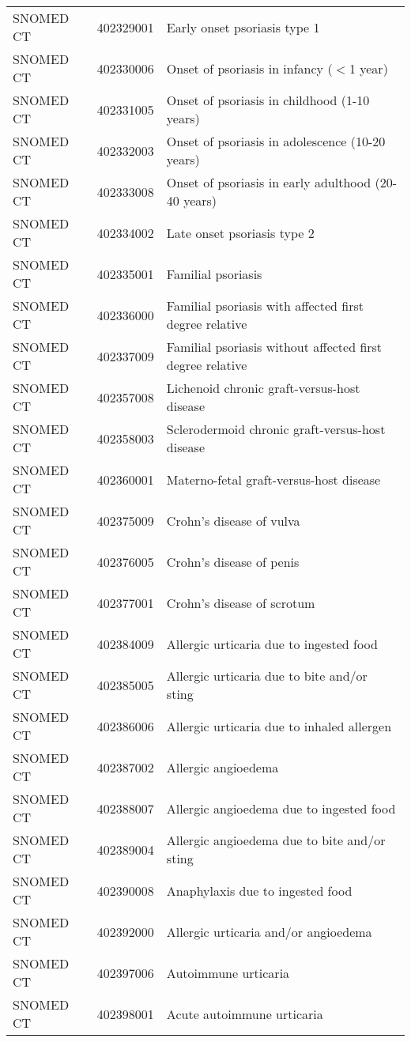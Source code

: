 \begin{longtable}{p{}p{}p{}}
  SNOMED CT & 402329001 & Early onset psoriasis type 1 \\ 
  SNOMED CT & 402330006 & Onset of psoriasis in infancy ($<$1 year) \\ 
  SNOMED CT & 402331005 & Onset of psoriasis in childhood (1-10 years) \\ 
  SNOMED CT & 402332003 & Onset of psoriasis in adolescence (10-20 years) \\ 
  SNOMED CT & 402333008 & Onset of psoriasis in early adulthood (20-40 years) \\ 
  SNOMED CT & 402334002 & Late onset psoriasis type 2 \\ 
  SNOMED CT & 402335001 & Familial psoriasis \\ 
  SNOMED CT & 402336000 & Familial psoriasis with affected first degree relative \\ 
  SNOMED CT & 402337009 & Familial psoriasis without affected first degree relative \\ 
  SNOMED CT & 402357008 & Lichenoid chronic graft-versus-host disease \\ 
  SNOMED CT & 402358003 & Sclerodermoid chronic graft-versus-host disease \\ 
  SNOMED CT & 402360001 & Materno-fetal graft-versus-host disease \\ 
  SNOMED CT & 402375009 & Crohn's disease of vulva \\ 
  SNOMED CT & 402376005 & Crohn's disease of penis \\ 
  SNOMED CT & 402377001 & Crohn's disease of scrotum \\ 
  SNOMED CT & 402384009 & Allergic urticaria due to ingested food \\ 
  SNOMED CT & 402385005 & Allergic urticaria due to bite and/or sting \\ 
  SNOMED CT & 402386006 & Allergic urticaria due to inhaled allergen \\ 
  SNOMED CT & 402387002 & Allergic angioedema \\ 
  SNOMED CT & 402388007 & Allergic angioedema due to ingested food \\ 
  SNOMED CT & 402389004 & Allergic angioedema due to bite and/or sting \\ 
  SNOMED CT & 402390008 & Anaphylaxis due to ingested food \\ 
  SNOMED CT & 402392000 & Allergic urticaria and/or angioedema \\ 
  SNOMED CT & 402397006 & Autoimmune urticaria \\ 
  SNOMED CT & 402398001 & Acute autoimmune urticaria \\ 

\end{longtable}

